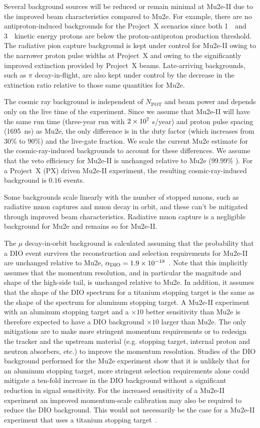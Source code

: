 Several background sources will be reduced or remain minimal at
Mu2e-II due to the improved beam characteristics compared to Mu2e.
For example, there are no antiproton-induced backgrounds for the
Project~X scenarios since both 1~\gev\ and 3~\gev\ kinetic energy
protons are below the proton-antiproton production threshold.  The
radiative pion capture background is kept under control for Mu2e-II
owing to the narrower proton pulse widths at Project~X and owing to
the significantly improved extinction provided by Project~X beams.
Late-arriving backgrounds, such as $\pi$ decay-in-flight, are also
kept under control by the decrease in the extinction ratio relative to
those same quantities for Mu2e.
   
The cosmic ray background is independent of $N_{\mathrm{POT}}$ and
beam power and depends only on the live time of the experiment. Since
we assume that Mu2e-II will have the same run time (three-year run
with $2\times10^{7}$ s/year) and proton pulse spacing (1695~ns) as Mu2e,
the only difference is in the duty factor (which increases from 30\%
to 90\%) and the live-gate fraction. We scale the current Mu2e
estimate for the cosmic-ray-induced backgrounds to account for these
differences.  We assume that the veto efficiency for Mu2e-II is
unchanged relative to Mu2e (99.99\% ). For a Project~X (PX) driven
Mu2e-II experiment, the resulting cosmic-ray-induced background is
$0.16$ events.

Some backgrounds scale linearly with the number of stopped muons, such
as radiative muon captures and muon decay in orbit, and these can't be
mitigated through improved beam characteristics.  Radiative muon
capture is a negligible background for Mu2e and remains so for
Mu2e-II.

The $\mu$ decay-in-orbit background is calculated assuming that the
probability that a DIO event survives the reconstruction and selection
requirements for Mu2e-II are unchanged relative to Mu2e,
$\alpha_{\mathrm{DIO}} = 1.9\times10^{-18}$~\cite{Mu2eCDR}.  Note that
this implicitly assumes that the momentum resolution, and in
particular the magnitude and shape of the high-side tail, is unchanged
relative to Mu2e. In addition, it assumes that the shape of the DIO
spectrum for a titanium stopping target is the same as the shape of
the spectrum for aluminum stopping target.  A Mu2e-II experiment with
an aluminum stopping target and a $\times 10$ better sensitivity than
Mu2e is therefore expected to have a DIO background $\times 10$ larger
than Mu2e.  The only mitigations are to make more stringent momentum
requirements or to redesign the tracker and the upstream material
(e.g. stopping target, internal proton and neutron absorbers, etc.) to
improve the momentum resolution.  Studies of the DIO background
performed for the Mu2e experiment show that it is unlikely that for an
aluminum stopping target, more stringent selection requirements alone
could mitigate a ten-fold increase in the DIO background without a
significant reduction in signal sensitivity.  For the increased
sensitivity of a Mu2e-II experiment an improved momentum-scale
calibration may also be required to reduce the DIO background.  This
would not necessarily be the case for a Mu2e-II experiment that uses a
titanium stopping target~\cite{DIOComment}.

